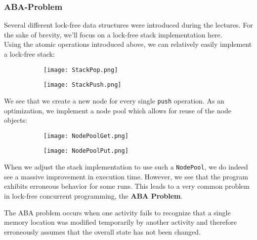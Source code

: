 \documentclass[main]{subfiles}
\begin{document}

\subsubsection{ABA-Problem}
Several different lock-free data structures were introduced during the lectures. For the sake of brevity, we'll focus on a lock-free stack implementation here.\\[3mm]
\newpage
Using the atomic operations introduced above, we can relatively easily implement a lock-free stack:
\begin{figure}[H]
    \centering
    \begin{subfigure}{.5\textwidth}
        \centering
        \texttt{[image: StackPop.png]}
    \end{subfigure}%
    \begin{subfigure}{.5\textwidth}
        \centering
        \texttt{[image: StackPush.png]}
    \end{subfigure}
\end{figure}
\noindent We see that we create a new node for every single \texttt{push} operation. As an optimization, we implement a node pool which allows for reuse of the node objects:
\begin{figure}[H]
    \centering
    \begin{subfigure}{.5\textwidth}
        \centering
        \texttt{[image: NodePoolGet.png]}
    \end{subfigure}%
    \begin{subfigure}{.5\textwidth}
        \centering
        \texttt{[image: NodePoolPut.png]}
    \end{subfigure}
\end{figure}
\noindent When we adjust the stack implementation to use such a \texttt{NodePool}, we do indeed see a massive improvement in execution time. However, we see that the program exhibits erroneous behavior for some runs. This leads to a very common problem in lock-free concurrent programming, the \textbf{ABA Problem}.
\begin{definition}
    The ABA problem occurs when one activity fails to recognize that a single memory location was modified temporarily by another activity and therefore erroneously assumes that the overall state has not been changed.
\end{definition}
\end{document}
